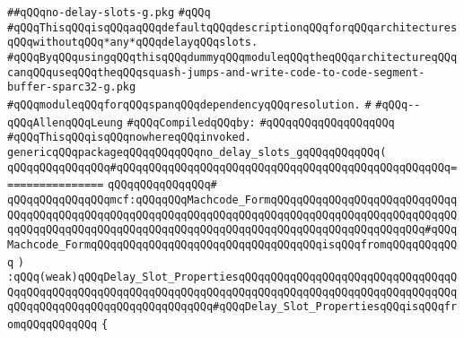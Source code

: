 \label{src/lib/compiler/back/low/jmp/no-delay-slots-g.pkg}
\verb|##qQQqno-delay-slots-g.pkg|\newline
\verb|#qQQq|\newline
\verb|#qQQqThisqQQqisqQQqaqQQqdefaultqQQqdescriptionqQQqforqQQqarchitecturesqQQqwithoutqQQq*any*qQQqdelayqQQqslots.|\newline
\verb|#qQQqByqQQqusingqQQqthisqQQqdummyqQQqmoduleqQQqtheqQQqarchitectureqQQqcanqQQquseqQQqtheqQQqsquash-jumps-and-write-code-to-code-segment-buffer-sparc32-g.pkg|\newline
\verb|#qQQqmoduleqQQqforqQQqspanqQQqdependencyqQQqresolution.|\newline
\verb|#|\newline
\verb|#qQQq--qQQqAllenqQQqLeung|\newline
\newline
\verb|#qQQqCompiledqQQqby:|\newline
\verb|#qQQqqQQqqQQqqQQqqQQq|\newline
\newline
\verb|#qQQqThisqQQqisqQQqnowhereqQQqinvoked.|\newline
\newline
\verb|genericqQQqpackageqQQqqQQqqQQqno_delay_slots_gqQQqqQQqqQQq(|\newline
\verb|qQQqqQQqqQQqqQQq#qQQqqQQqqQQqqQQqqQQqqQQqqQQqqQQqqQQqqQQqqQQqqQQqqQQq================|\newline
\verb|qQQqqQQqqQQqqQQq#|\newline
\verb|qQQqqQQqqQQqqQQqmcf:qQQqqQQqMachcode_FormqQQqqQQqqQQqqQQqqQQqqQQqqQQqqQQqqQQqqQQqqQQqqQQqqQQqqQQqqQQqqQQqqQQqqQQqqQQqqQQqqQQqqQQqqQQqqQQqqQQqqQQqqQQqqQQqqQQqqQQqqQQqqQQqqQQqqQQqqQQqqQQqqQQqqQQqqQQqqQQqqQQq#qQQqMachcode_FormqQQqqQQqqQQqqQQqqQQqqQQqqQQqqQQqqQQqisqQQqfromqQQqqQQqqQQq|\newline
\verb|)|\newline
\verb|:qQQq(weak)qQQqDelay_Slot_PropertiesqQQqqQQqqQQqqQQqqQQqqQQqqQQqqQQqqQQqqQQqqQQqqQQqqQQqqQQqqQQqqQQqqQQqqQQqqQQqqQQqqQQqqQQqqQQqqQQqqQQqqQQqqQQqqQQqqQQqqQQqqQQqqQQqqQQqqQQq#qQQqDelay_Slot_PropertiesqQQqisqQQqfromqQQqqQQqqQQq|\newline
\verb|{|\newline
